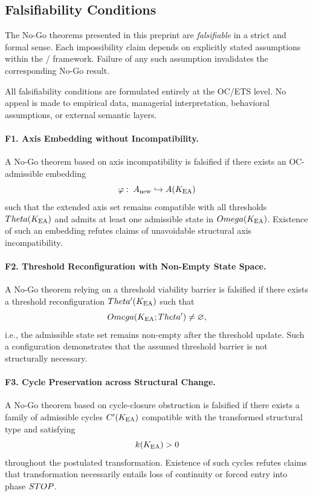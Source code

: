 ﻿%

\subsection*{Falsifiability Conditions}

The No-Go theorems presented in this preprint are \emph{falsifiable} in a strict
and formal sense. Each impossibility claim depends on explicitly stated
assumptions within the \OC/ framework. Failure of any such
assumption invalidates the corresponding No-Go result.

All falsifiability conditions are formulated entirely at the OC/ETS level.
No appeal is made to empirical data, managerial interpretation, behavioral
assumptions, or external semantic layers.

\paragraph{F1. Axis Embedding without Incompatibility.}
A No-Go theorem based on axis incompatibility is falsified if there exists an
OC-admissible embedding
\[
\varphi:\; A_{\mathrm{new}} \hookrightarrow A(K_{\mathrm{EA}})
\]
such that the extended axis set remains compatible with all thresholds
$Theta(K_{\mathrm{EA}})$ and admits at least one admissible state in $Omega(K_{\mathrm{EA}})$.
Existence of such an embedding refutes claims of unavoidable structural
axis incompatibility.

\paragraph{F2. Threshold Reconfiguration with Non-Empty State Space.}
A No-Go theorem relying on a threshold viability barrier is falsified if there
exists a threshold reconfiguration $Theta'(K_{\mathrm{EA}})$ such that
\[
Omega(K_{\mathrm{EA}};Theta') \neq \varnothing,
\]
i.e., the admissible state set remains non-empty after the threshold update.
Such a configuration demonstrates that the assumed threshold barrier is not
structurally necessary.

\paragraph{F3. Cycle Preservation across Structural Change.}
A No-Go theorem based on cycle-closure obstruction is falsified if there exists
a family of admissible cycles $C'(K_{\mathrm{EA}})$ compatible with the transformed
structural type and satisfying
\[
k(K_{\mathrm{EA}}) > 0
\]
throughout the postulated transformation.
Existence of such cycles refutes claims that transformation necessarily entails
loss of continuity or forced entry into phase $STOP$.

